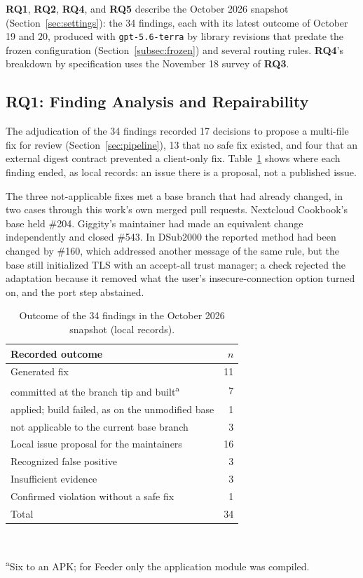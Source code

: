 \documentclass[conference]{IEEEtran}
\newcommand{\researchq}[1]{\textbf{RQ#1}}
\begin{document}
\researchq{1}, \researchq{2}, \researchq{4}, and \researchq{5} describe the
October 2026 snapshot (Section~\ref{sec:settings}):
the 34 findings, each with its latest outcome of October 19 and 20, produced
with \texttt{gpt-5.6-terra} by library revisions that predate the frozen
configuration (Section~\ref{subsec:frozen}) and several routing rules.
\researchq{4}'s breakdown by specification uses the November 18 survey of
\researchq{3}.

\subsection{\researchq{1}: Finding Analysis and Repairability}
\label{subsec:rq1}

The adjudication of the 34 findings recorded 17 decisions to propose a
multi-file fix for review (Section~\ref{sec:pipeline}), 13 that no safe fix
existed, and four that an external digest contract prevented a client-only
fix. Table~\ref{tab:adjudication} shows where each finding ended, as local
records: an issue there is a proposal, not a published issue.

The three not-applicable fixes met a base branch that had already changed, in
two cases through this work's own merged pull requests. Nextcloud Cookbook's
base held \#204. Giggity's maintainer had made an equivalent change
independently and closed \#543. In DSub2000 the reported method had been
changed by \#160, which addressed another message of the same rule, but the
base still initialized TLS with an accept-all trust manager; a check rejected
the adaptation because it removed what the user's insecure-connection option
turned on, and the port step abstained.

\begin{table}[H]
\centering
\caption{Outcome of the 34 findings in the October 2026 snapshot (local
records).}
\label{tab:adjudication}
\footnotesize
\begin{tabular}{p{6.1cm}r}
\toprule
Recorded outcome & $n$ \\
\midrule
Generated fix & 11 \\
\quad committed at the branch tip and built\textsuperscript{a} & 7 \\
\quad applied; build failed, as on the unmodified base & 1 \\
\quad not applicable to the current base branch & 3 \\
Local issue proposal for the maintainers & 16 \\
Recognized false positive & 3 \\
Insufficient evidence & 3 \\
Confirmed violation without a safe fix & 1 \\
\midrule
Total & 34 \\
\bottomrule
\end{tabular}
\\[2pt]\raggedright\scriptsize\textsuperscript{a}Six to an APK; for Feeder only
the application module was compiled.
\end{table}
\end{document}
